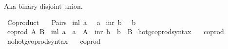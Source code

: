 %
\begin{isabellebody}%
%
%
\isadelimdocument
%
\endisadelimdocument
%
\isatagdocument
%
\isamarkuptrue%
%
\endisatagdocument
{\isafolddocument}%
%
\isadelimdocument
%
\endisadelimdocument
%
\begin{isamarkuptext}%
Aka binary disjoint union.%
\end{isamarkuptext}\isamarkuptrue%
%
\isadelimtheory
%
\endisadelimtheory
%
\isatagtheory
{}\isamarkupfalse%
\ Coproduct\isanewline
\ \ \ Pairs\isanewline
{}%
\endisatagtheory
{\isafoldtheory}%
%
\isadelimtheory
%
\endisadelimtheory
\isanewline
\isanewline
{}\isamarkupfalse%
\ {\isachardoublequoteopen}inl\ a\ {\isacharequal}{\kern0pt}\ {\isasymlangle}{\isacharbraceleft}{\kern0pt}{\isacharbraceright}{\kern0pt}{\isacharcomma}{\kern0pt}\ a{\isasymrangle}{\isachardoublequoteclose}\isanewline
{}\isamarkupfalse%
\ {\isachardoublequoteopen}inr\ b\ {\isacharequal}{\kern0pt}\ {\isasymlangle}{\isacharbraceleft}{\kern0pt}{\isacharbraceleft}{\kern0pt}{\isacharbraceright}{\kern0pt}{\isacharbraceright}{\kern0pt}{\isacharcomma}{\kern0pt}\ b{\isasymrangle}{\isachardoublequoteclose}\isanewline
{}\isamarkupfalse%
\ {\isachardoublequoteopen}coprod\ A\ B\ {\isasymequiv}\ {\isacharbraceleft}{\kern0pt}inl\ a\ {\isacharbar}{\kern0pt}\ a\ {\isasymin}\ A{\isacharbraceright}{\kern0pt}\ {\isasymunion}\ {\isacharbraceleft}{\kern0pt}inr\ b\ {\isacharbar}{\kern0pt}\ b\ {\isasymin}\ B{\isacharbraceright}{\kern0pt}{\isachardoublequoteclose}\isanewline
\isanewline
{}\isamarkupfalse%
\ hotg{\isacharunderscore}{\kern0pt}coprod{\isacharunderscore}{\kern0pt}syntax\ \ \isamarkupfalse%
\ coprod\ {\isacharparenleft}{\kern0pt}\ {\isachardoublequoteopen}{\isasymCoprod}{\isachardoublequoteclose}\ {}{}{\isacharparenright}{\kern0pt}\ \isamarkupfalse%
\isanewline
{}\isamarkupfalse%
\ no{\isacharunderscore}{\kern0pt}hotg{\isacharunderscore}{\kern0pt}coprod{\isacharunderscore}{\kern0pt}syntax\ \ \isamarkupfalse%
\ coprod\ {\isacharparenleft}{\kern0pt}\ {\isachardoublequoteopen}{\isasymCoprod}{\isachardoublequoteclose}\ {}{}{\isacharparenright}{\kern0pt}\ \isamarkupfalse%
\isanewline
\isanewline

\end{isabellebody}
